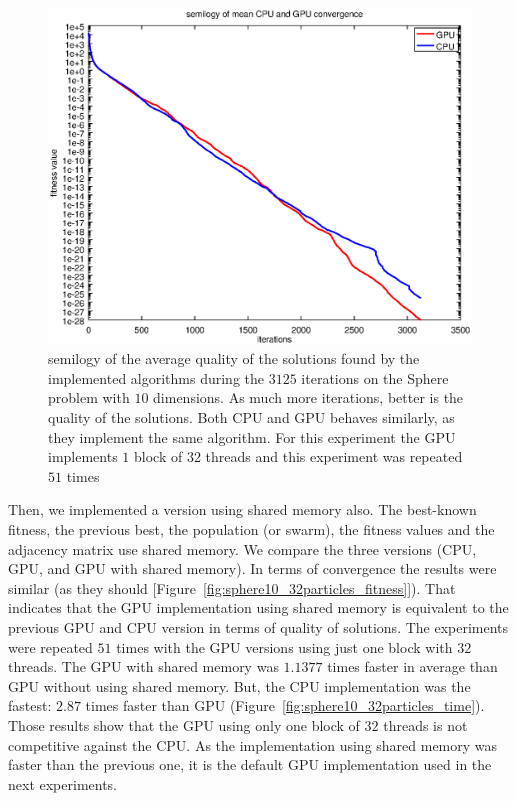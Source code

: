 \documentclass[conference]{IEEEtran}
\begin{document}
    \begin{figure}[!htb]
        \centering
        \includegraphics[width=\columnwidth]{../img/semilogy_convergence.eps}
        \caption{semilogy of the average quality of the solutions found by the implemented algorithms during the $3125$ iterations on the Sphere problem with $10$ dimensions. As much more iterations, better is the quality of the solutions. Both CPU and GPU behaves similarly, as they implement the same algorithm. For this experiment the GPU implements $1$ block of $32$ threads and this experiment was repeated $51$ times}
        \label{fig:semilogy_convergence}
    \end{figure}

    Then, we implemented a version using shared memory also.
    The best-known fitness, the previous best, the population (or swarm), the fitness values and the adjacency matrix use shared memory.
    We compare the three versions (CPU, GPU, and GPU with shared memory). In terms of convergence the results were similar (as they should [Figure~\ref{fig:sphere10_32particles_fitness}]).
    That indicates that the GPU implementation using shared memory is equivalent to the previous GPU and CPU version in terms of quality of solutions.
    The experiments were repeated $51$ times with the GPU versions using just one block with $32$ threads. The GPU with shared memory was $1.1377$ times faster in average than GPU without using shared memory. But, the CPU implementation was the fastest: $2.87$ times faster than GPU (Figure~\ref{fig:sphere10_32particles_time}).
    Those results show that the GPU using only one block of $32$ threads is not competitive against the CPU. As the implementation using shared memory was faster than the previous one, it is the default GPU implementation used in the next experiments.
\end{document}
